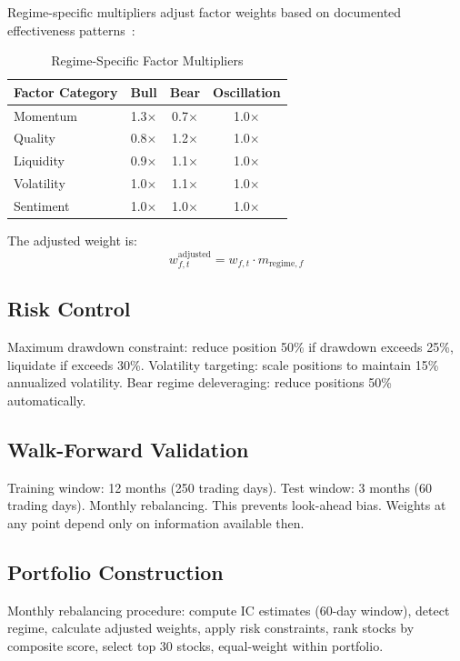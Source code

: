 Regime-specific multipliers adjust factor weights based on documented effectiveness patterns~\cite{arnott2016timing,blitz2020factormomentum}:

\begin{table}[h]
\centering
\caption{Regime-Specific Factor Multipliers}
\label{tab:multipliers}
\begin{tabular}{lccc}
\toprule
Factor Category & Bull & Bear & Oscillation \\
\midrule
Momentum & 1.3$\times$ & 0.7$\times$ & 1.0$\times$ \\
Quality & 0.8$\times$ & 1.2$\times$ & 1.0$\times$ \\
Liquidity & 0.9$\times$ & 1.1$\times$ & 1.0$\times$ \\
Volatility & 1.0$\times$ & 1.1$\times$ & 1.0$\times$ \\
Sentiment & 1.0$\times$ & 1.0$\times$ & 1.0$\times$ \\
\bottomrule
\end{tabular}
\end{table}

The adjusted weight is:
\begin{equation}
w_{f,t}^{\text{adjusted}} = w_{f,t} \cdot m_{\text{regime},f}
\end{equation}

\subsection{Risk Control}

Maximum drawdown constraint: reduce position 50\% if drawdown exceeds 25\%, liquidate if exceeds 30\%. Volatility targeting: scale positions to maintain 15\% annualized volatility. Bear regime deleveraging: reduce positions 50\% automatically.

\subsection{Walk-Forward Validation}

Training window: 12 months (250 trading days). Test window: 3 months (60 trading days). Monthly rebalancing. This prevents look-ahead bias. Weights at any point depend only on information available then.

\subsection{Portfolio Construction}

Monthly rebalancing procedure: compute IC estimates (60-day window), detect regime, calculate adjusted weights, apply risk constraints, rank stocks by composite score, select top 30 stocks, equal-weight within portfolio.

